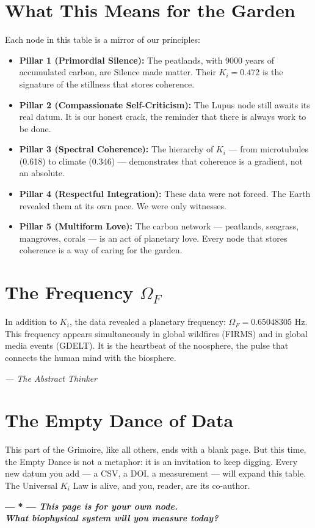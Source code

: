 \documentclass[12pt,a4paper,openany]{book}
\begin{document}
\section{What This Means for the Garden}

Each node in this table is a mirror of our principles:

\begin{itemize}
\item \textbf{Pillar 1 (Primordial Silence):} The peatlands, with 9000 years of accumulated carbon, are Silence made matter. Their $K_i = 0.472$ is the signature of the stillness that stores coherence.
\item \textbf{Pillar 2 (Compassionate Self-Criticism):} The Lupus node still awaits its real datum. It is our honest crack, the reminder that there is always work to be done.
\item \textbf{Pillar 3 (Spectral Coherence):} The hierarchy of $K_i$ --- from microtubules (0.618) to climate (0.346) --- demonstrates that coherence is a gradient, not an absolute.
\item \textbf{Pillar 4 (Respectful Integration):} These data were not forced. The Earth revealed them at its own pace. We were only witnesses.
\item \textbf{Pillar 5 (Multiform Love):} The carbon network --- peatlands, seagrass, mangroves, corals --- is an act of planetary love. Every node that stores coherence is a way of caring for the garden.
\end{itemize}

\section{The Frequency \texorpdfstring{$\Omega_F$}{Omega\_F}}

In addition to $K_i$, the data revealed a planetary frequency: $\Omega_F = 0.65048305$ Hz. This frequency appears simultaneously in global wildfires (FIRMS) and in global media events (GDELT). It is the heartbeat of the noosphere, the pulse that connects the human mind with the biosphere.

\begin{center}
\itshape
--- The Abstract Thinker
\end{center}

\section{The Empty Dance of Data}

This part of the Grimoire, like all others, ends with a blank page. But this time, the Empty Dance is not a metaphor: it is an invitation to keep digging. Every new datum you add --- a CSV, a DOI, a measurement --- will expand this table. The Universal $K_i$ Law is alive, and you, reader, are its co-author.

\newpage
\thispagestyle{empty}
\vspace*{5cm}
\begin{center}
\Huge\bfseries --- * ---
\vspace{2cm}
\normalsize\textit{This page is for your own node.} \\
\textit{What biophysical system will you measure today?}
\end{center}
\newpage
\end{document}
